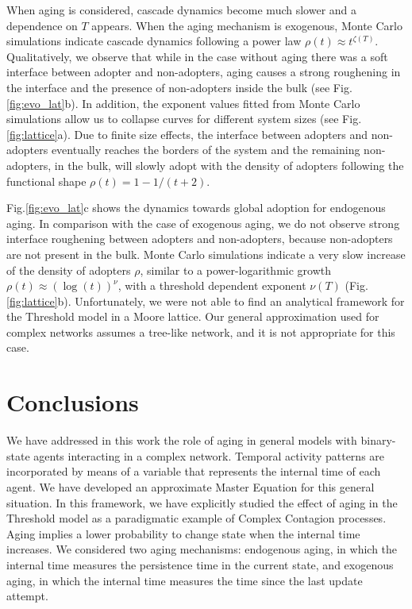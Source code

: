 When aging is considered, cascade dynamics become much slower and a dependence on $T$ appears. When the aging mechanism is exogenous, Monte Carlo simulations indicate cascade dynamics following a power law $\rho(t) \approx t^{\zeta(T)}$. Qualitatively, we observe that while in the case without aging there was a soft interface between adopter and non-adopters, aging causes a strong roughening in the interface and the presence of non-adopters inside the bulk (see Fig. \ref{fig:evo_lat}b). In addition, the exponent values fitted from Monte Carlo simulations allow us to collapse curves for different system sizes (see Fig. \ref{fig:lattice}a). Due to finite size effects, the interface between adopters and non-adopters eventually reaches the borders of the system and the remaining non-adopters, in the bulk, will slowly adopt with the density of adopters following the functional shape $\rho(t) = 1- 1/(t+2)$.
 
Fig.\ref{fig:evo_lat}c shows the dynamics towards global adoption for endogenous aging. In comparison with the case of exogenous aging, we do not observe strong interface roughening between adopters and non-adopters, because non-adopters are not present in the bulk. Monte Carlo simulations indicate a very slow increase of the density of adopters $\rho$, similar to a power-logarithmic growth  $\rho(t) \approx (\log(t))^{\nu}$, with a threshold dependent exponent $\nu(T)$  (Fig. \ref{fig:lattice}b). Unfortunately, we were not able to find an analytical framework for the Threshold model in a Moore lattice. Our general approximation used for complex networks assumes a tree-like network, and it is not appropriate for this case. 

\section{\label{sec:Summary and Conclusions} Conclusions}

We have addressed in this work the role of aging in general models with binary-state agents interacting in a complex network. Temporal activity patterns are incorporated by means of a variable that represents the internal time of each agent. We have developed an approximate Master Equation for this general situation. In this framework, we have explicitly studied the effect of aging in the Threshold model as a paradigmatic example of Complex Contagion processes. Aging implies a lower probability to change state when the internal time increases. We considered  two aging mechanisms: endogenous aging, in which the internal time measures the persistence time in the current state, and exogenous aging, in which the internal time measures the time since the last update attempt.

